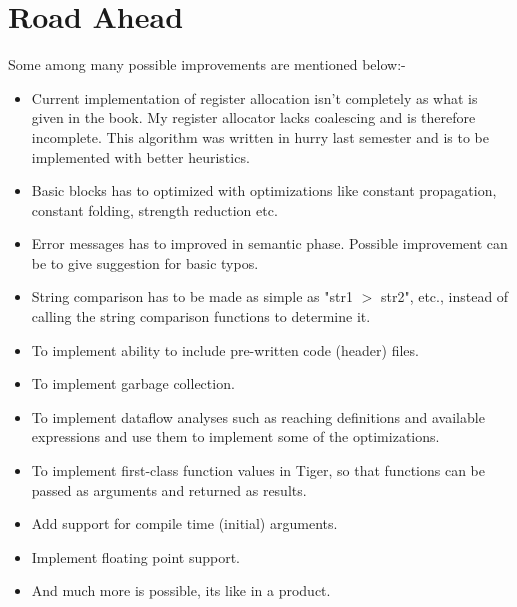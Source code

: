 \section{Road Ahead}

Some among many possible improvements are mentioned below:-

\begin{itemize}
	\item Current implementation of register allocation isn't completely as what is given in the book. My register allocator lacks coalescing and is therefore incomplete. This algorithm was written in hurry last semester and is to be implemented with better heuristics.
	\item Basic blocks has to optimized with optimizations like constant propagation, constant folding, strength reduction etc.
	\item Error messages has to improved in semantic phase. Possible improvement can be to give suggestion for basic typos.
	\item String comparison has to be made as simple as "str1 $>$ str2", etc.,  instead of calling the string comparison functions to determine it.
	\item To implement ability to include pre-written code (header) files.
	\item To implement garbage collection.
	\item To implement dataflow analyses such as reaching definitions and available expressions and use them to implement some of the optimizations.
	\item To implement first-class function values in Tiger, so that functions can be passed as arguments and returned as results.
	\item Add support for compile time (initial) arguments.
	\item Implement floating point support.
	\item And much more is possible, its like in a product.
\end{itemize}
